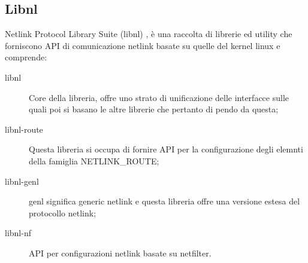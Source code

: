 \subsection{Libnl}
Netlink Protocol Library Suite (libnl) \cite{K10}, \`e una raccolta di librerie ed utility che forniscono API di comunicazione netlink basate su quelle del kernel linux e comprende:
\begin{description}                     %
  \item[libnl] Core della libreria, offre uno strato di unificazione delle interfacce sulle quali poi si basano le altre librerie che pertanto di pendo da questa;
  \item[libnl-route] Questa libreria si occupa di fornire API per la configurazione degli elemnti della famiglia NETLINK\_ROUTE;
  \item[libnl-genl] genl significa generic netlink e questa libreria offre una versione estesa del protocollo netlink;
  \item[libnl-nf] API per configurazioni netlink basate su netfilter.

\end{description}

\clearpage{\pagestyle{empty}\cleardoublepage}
